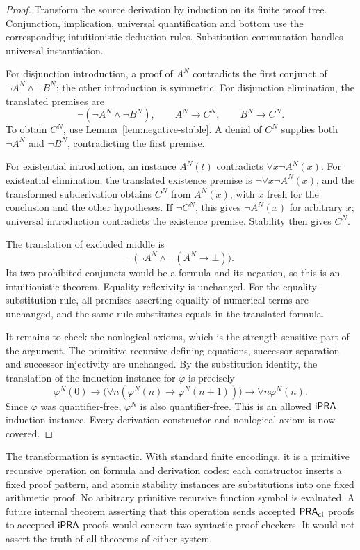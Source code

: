 \begin{proof}
Transform the source derivation by induction on its finite proof tree.
Conjunction, implication, universal quantification and bottom use the
corresponding intuitionistic deduction rules. Substitution commutation
handles universal instantiation.

For disjunction introduction, a proof of \(A^N\) contradicts the first
conjunct of \(\neg A^N\land\neg B^N\); the other introduction is
symmetric. For disjunction elimination, the translated premises are
\[
 \neg(\neg A^N\land\neg B^N),\qquad
 A^N\to C^N,\qquad B^N\to C^N.
\]
To obtain \(C^N\), use Lemma~\ref{lem:negative-stable}. A denial of
\(C^N\) supplies both \(\neg A^N\) and \(\neg B^N\), contradicting
the first premise.

For existential introduction, an instance \(A^N(t)\) contradicts
\(\forall x\neg A^N(x)\). For existential elimination, the translated
existence premise is \(\neg\forall x\neg A^N(x)\), and the transformed
subderivation obtains \(C^N\) from \(A^N(x)\), with \(x\) fresh for
the conclusion and the other hypotheses. If \(\neg C^N\), this gives
\(\neg A^N(x)\) for arbitrary \(x\); universal introduction contradicts
the existence premise. Stability then gives \(C^N\).

The translation of excluded middle is
\[
 \neg\bigl(\neg A^N\land\neg(A^N\to\bot)\bigr).
\]
Its two prohibited conjuncts would be a formula and its negation, so this
is an intuitionistic theorem. Equality reflexivity is unchanged. For the
equality-substitution rule, all premises asserting equality of numerical
terms are unchanged, and the same rule substitutes equals in the translated
formula.

It remains to check the nonlogical axioms, which is the strength-sensitive
part of the argument. The primitive recursive defining equations,
successor separation and successor injectivity are unchanged. By the
substitution identity, the translation of the induction instance for
\(\varphi\) is precisely
\[
 \varphi^N(0)\to
 \bigl(\forall n(\varphi^N(n)\to\varphi^N(n+1))\bigr)
 \to\forall n\varphi^N(n).
\]
Since \(\varphi\) was quantifier-free, \(\varphi^N\) is also
quantifier-free. This is an allowed \(\mathsf{iPRA}\) induction instance.
Every derivation constructor and nonlogical axiom is now covered.
\end{proof}

The transformation is syntactic. With standard finite encodings, it is a
primitive recursive operation on formula and derivation codes: each
constructor inserts a fixed proof pattern, and atomic stability instances
are substitutions into one fixed arithmetic proof. No arbitrary primitive
recursive function symbol is evaluated. A future internal theorem asserting
that this operation sends accepted \(\mathsf{PRA}_{\mathrm{cl}}\) proofs to accepted \(\mathsf{iPRA}\)
proofs would concern two syntactic proof checkers. It would not assert the
truth of all theorems of either system.

